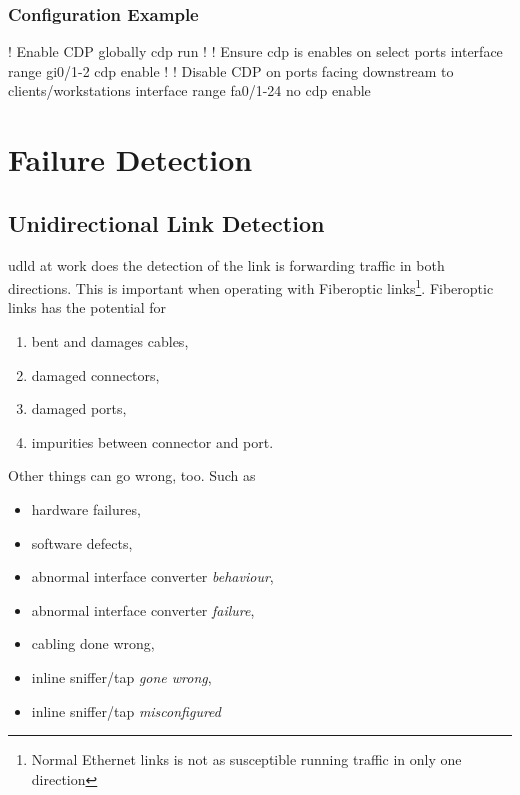 \subsubsection{Configuration Example}

\begin{cisco}
! Enable CDP globally
cdp run
!
! Ensure cdp is enables on select ports
interface range gi0/1-2
 cdp enable
!
! Disable CDP on ports facing downstream to clients/workstations
interface range fa0/1-24
 no cdp enable
\end{cisco}

\section{Failure Detection}

\subsection[UDLD]{Unidirectional Link Detection}

\gls{udld} at work does the detection of the link is forwarding traffic in both directions. This is important when operating with Fiberoptic links\footnote{Normal Ethernet links is not as susceptible running traffic in only one direction}. Fiberoptic links has the potential for
\begin{enumerate}
    \item bent and damages cables,
    \item damaged connectors,
    \item damaged ports,
    \item impurities between connector and port.
\end{enumerate}


Other things can go wrong, too. Such as
\begin{itemize}
    \item hardware failures,
    \item software defects,
    \item abnormal interface converter \textit{behaviour},
    \item abnormal interface converter \textit{failure},
    \item cabling done wrong,
    \item inline sniffer/tap \textit{gone wrong},
    \item inline sniffer/tap \textit{misconfigured}
\end{itemize}

